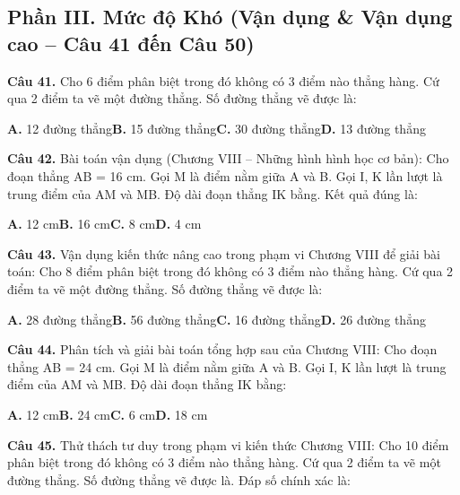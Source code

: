 \documentclass[11pt,a4paper]{article}
\begin{document}
\subsection*{\color{accent} Phần III. Mức độ Khó (Vận dụng \& Vận dụng cao -- Câu 41 đến Câu 50)}
\textbf{\color{primary} Câu 41.} Cho 6 điểm phân biệt trong đó không có 3 điểm nào thẳng hàng. Cứ qua 2 điểm ta vẽ một đường thẳng. Số đường thẳng vẽ được là:\par
\hspace*{1.5em}\textbf{A.} 12 đường thẳng\quad\quad \textbf{B.} 15 đường thẳng\quad\quad \textbf{C.} 30 đường thẳng\quad\quad \textbf{D.} 13 đường thẳng\par\vspace{2pt}
\textbf{\color{primary} Câu 42.} Bài toán vận dụng (Chương VIII – Những hình hình học cơ bản): Cho đoạn thẳng AB = 16 cm. Gọi M là điểm nằm giữa A và B. Gọi I, K lần lượt là trung điểm của AM và MB. Độ dài đoạn thẳng IK bằng. Kết quả đúng là:\par
\hspace*{1.5em}\textbf{A.} 12 cm\quad\quad \textbf{B.} 16 cm\quad\quad \textbf{C.} 8 cm\quad\quad \textbf{D.} 4 cm\par\vspace{2pt}
\textbf{\color{primary} Câu 43.} Vận dụng kiến thức nâng cao trong phạm vi Chương VIII để giải bài toán: Cho 8 điểm phân biệt trong đó không có 3 điểm nào thẳng hàng. Cứ qua 2 điểm ta vẽ một đường thẳng. Số đường thẳng vẽ được là:\par
\hspace*{1.5em}\textbf{A.} 28 đường thẳng\quad\quad \textbf{B.} 56 đường thẳng\quad\quad \textbf{C.} 16 đường thẳng\quad\quad \textbf{D.} 26 đường thẳng\par\vspace{2pt}
\textbf{\color{primary} Câu 44.} Phân tích và giải bài toán tổng hợp sau của Chương VIII: Cho đoạn thẳng AB = 24 cm. Gọi M là điểm nằm giữa A và B. Gọi I, K lần lượt là trung điểm của AM và MB. Độ dài đoạn thẳng IK bằng:\par
\hspace*{1.5em}\textbf{A.} 12 cm\quad\quad \textbf{B.} 24 cm\quad\quad \textbf{C.} 6 cm\quad\quad \textbf{D.} 18 cm\par\vspace{2pt}
\textbf{\color{primary} Câu 45.} Thử thách tư duy trong phạm vi kiến thức Chương VIII: Cho 10 điểm phân biệt trong đó không có 3 điểm nào thẳng hàng. Cứ qua 2 điểm ta vẽ một đường thẳng. Số đường thẳng vẽ được là. Đáp số chính xác là:\par
\end{document}
